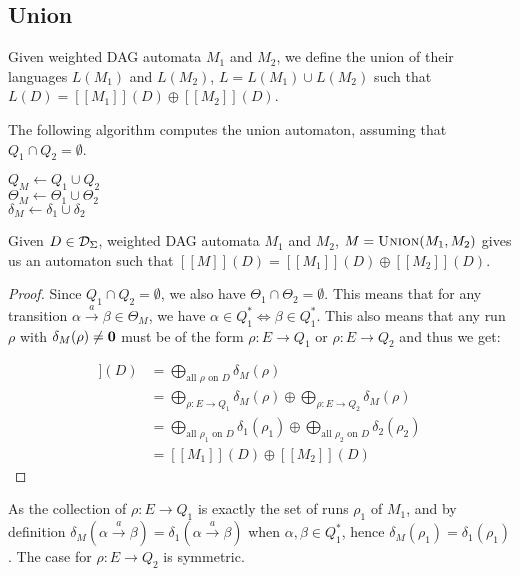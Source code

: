 \documentclass[11pt]{article}
\begin{document}
\subsection{Union}
Given weighted DAG automata $M_1$ and $M_2$, we define the union of their
languages $L(M_1)$ and $L(M_2)$, $L = L(M_1) \cup L(M_2)$ such that $L(D) =
[[M_1]](D) \oplus [[M_2]](D)$. 

The following algorithm computes the union automaton, assuming that $Q_1 \cap
Q_2 = \emptyset$.

\begin{algorithm}[!h]
  \caption{$\textsc{Union}(M_1 = \langle \Sigma, Q_1, \Theta_1, \delta_1, \K
  \rangle, M_2 = \langle \Sigma, Q_2, \Theta_2, \delta_2, \K \rangle)$}
	\label{alg:union}
  $Q_M \gets Q_1 \cup Q_2$\\
  $\Theta_M \gets \Theta_1 \cup \Theta_2$\\
  $\delta_M \gets \delta_1 \cup \delta_2$\\
\end{algorithm}

\begin{theorem}
  Given $D \in \mathcal{D}_\Sigma$, weighted DAG automata $M_1$ and $M_2$, $M =
    \textsc{Union}(M_1, M_2)$ gives us an automaton such that $[[M]](D) =
    [[M_1]](D) \oplus [[M_2]](D)$.
\end{theorem}

\begin{proof}
  Since $Q_1 \cap Q_2 = \emptyset$, we also have $\Theta_1 \cap \Theta_2 =
  \emptyset$. This means that for any transition $\alpha \xrightarrow{a} \beta
  \in \Theta_M$, we have $\alpha \in Q_1^* \Longleftrightarrow \beta \in Q_1^*$.
  This also means that any run $\rho$ with $\delta_M(\rho) \ne \boldsymbol{0}$ must be
  of the form $\rho: E \rightarrow Q_1$ or $\rho: E \rightarrow Q_2$ and thus we
  get:
  
  \begin{align*}
    [[M]](D) &= \bigoplus_{\text{all } \rho \text{ on } D} \delta_M(\rho)\\
    &= \bigoplus_{\rho: E \rightarrow Q_1} \delta_M(\rho) \oplus \bigoplus_{\rho: E \rightarrow Q_2} \delta_M(\rho)\\
    &= \bigoplus_{\text{all } \rho_1 \text{ on } D} \delta_1(\rho_1) \oplus \bigoplus_{\text{all } \rho_2 \text{ on } D} \delta_2(\rho_2)\\
    &= [[M_1]](D) \oplus [[M_2]](D)
  \end{align*}
\end{proof}
As the collection of $\rho: E \rightarrow Q_1$ is exactly the set of runs
$\rho_1$ of $M_1$, and by definition $\delta_M(\alpha \xrightarrow{a} \beta) =
\delta_1(\alpha \xrightarrow{a} \beta)$ when $\alpha,\beta \in Q_1^*$, hence
$\delta_M(\rho_1) = \delta_1(\rho_1)$. The case for
 $\rho: E \rightarrow Q_2$ is symmetric. 
\end{document}
